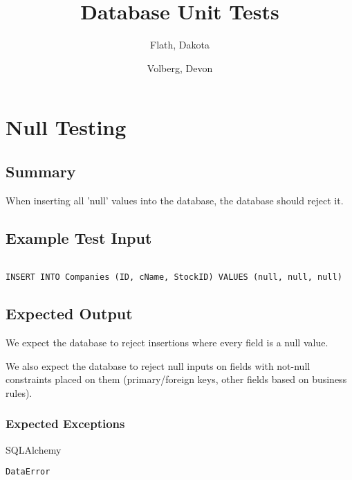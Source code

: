 \documentclass[12pt]{article}
\author{
	Flath, Dakota\\
	\and
	Volberg, Devon\\
}
\begin{document}
\renewcommand{\baselinestretch}{1.15} %
\setlength{\parindent}{0pt} %
\setlength{\parskip}{0.8em} %

\title{Database Unit Tests}
\maketitle

\section{Null Testing}

\subsection{Summary}

When inserting all 'null' values into the database, the database should reject it.

\subsection{Example Test Input}

\begin{verbatim}

INSERT INTO Companies (ID, cName, StockID) VALUES (null, null, null)

\end{verbatim}

\subsection{Expected Output}

We expect the database to reject insertions where every field is a null value.

We also expect the database to reject null inputs on fields with not-null constraints placed on them (primary/foreign keys, other fields based on business rules). 

\subsubsection{Expected Exceptions}

SQLAlchemy 

\begin{verbatim}
DataError
\end{verbatim}
\end{document}
